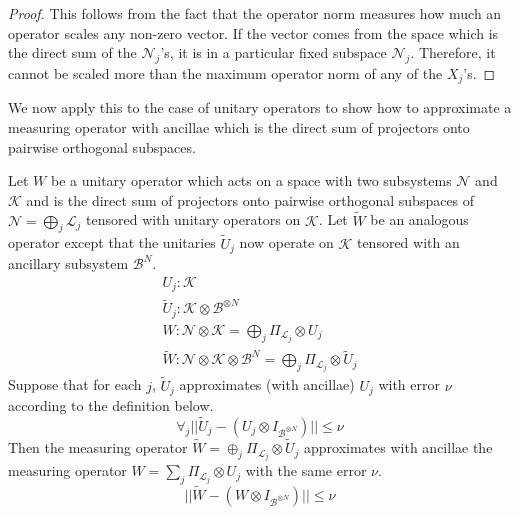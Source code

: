 \begin{proof}
This follows from the fact that the operator norm measures how much
an operator scales any non-zero vector. If the vector comes from the
space which is the direct sum of the $\mathcal{N}_j$'s, it is in a
particular fixed subspace $\mathcal{N}_j$. Therefore, it cannot be scaled
more than the maximum operator norm of any of the $X_j$'s.
\end{proof}

We now apply this to the case of unitary operators
to show how to approximate a measuring operator with
ancillae which is the direct sum of projectors onto pairwise orthogonal subspaces.

\begin{lemma}
\label{lemma:error-sum}
Let $W$ be a unitary operator which acts on a space with two subsystems
$\mathcal{N}$ and $\mathcal{K}$ and is the direct sum of projectors onto
pairwise orthogonal subspaces of $\mathcal{N} = \bigoplus_j \mathcal{L}_j$
tensored with unitary operators on $\mathcal{K}$.
Let $\tilde{W}$ be an analogous operator except that the unitaries $\tilde{U}_j$
now operate on $\mathcal{K}$ tensored with an ancillary subsystem
$\mathcal{B}^N$.
%
\begin{eqnarray}
U_j : \mathcal{K}\\
\tilde{U}_j : \mathcal{K} \otimes \mathcal{B}^{\otimes N}\\
W : \mathcal{N} \otimes \mathcal{K} = \bigoplus_j \Pi_{\mathcal{L}_j} \otimes U_j \\
\tilde{W} : \mathcal{N} \otimes \mathcal{K} \otimes \mathcal{B}^N =
\bigoplus_j \Pi_{\mathcal{L}_j} \otimes \tilde{U}_j
\end{eqnarray}
%
Suppose that for each $j$,
$\tilde{U}_j$ approximates (with ancillae) $U_j$ with error $\nu$
according to the
definition below.
%
\begin{equation}
\forall_j || \tilde{U}_j - (U_j \otimes I_{\mathcal{B}^{\otimes N}}) || \le \nu
\label{eqn:uj_approx}
\end{equation}
%
Then the measuring operator
$\tilde{W} = \oplus_j \Pi_{\mathcal{L}_j} \otimes \tilde{U}_j$ approximates
with ancillae the measuring operator
$W = \sum_j \Pi_{\mathcal{L}_j} \otimes U_j$ with the same error $\nu$.
%
\begin{equation}
|| \tilde{W} - (W \otimes I_{\mathcal{B}^{\otimes N}}) || \le \nu
\end{equation}
%
\end{lemma}

